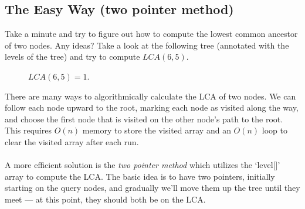 \documentclass[11pt]{article}
\theoremstyle{plain}
\theoremstyle{definition}
\begin{document}
\subsection{The Easy Way (two pointer method)}
Take a minute and try to figure out how to compute the lowest common ancestor of two nodes. Any ideas? Take a look at the following tree (annotated with the levels of the tree) and try to compute $LCA(6, 5)$.
\begin{figure}[!ht]
\caption{$LCA(6, 5) = 1$.}
\centering
{}
\end{figure}
There are many ways to algorithmically calculate the LCA of two nodes. We can follow each node upward to the root, marking each node as visited along the way, and choose the first node that is visited on the other node's path to the root. This requires $O(n)$ memory to store the visited array and an $O(n)$ loop to clear the visited array after each run.
\\\\
\noindent
A more efficient solution is the \emph{two pointer method} which utilizes the `level[]' array to compute the LCA. The basic idea is to have two pointers, initially starting on the query nodes, and gradually we'll move them up the tree until they meet --- at this point, they should both be on the LCA.
\end{document}
